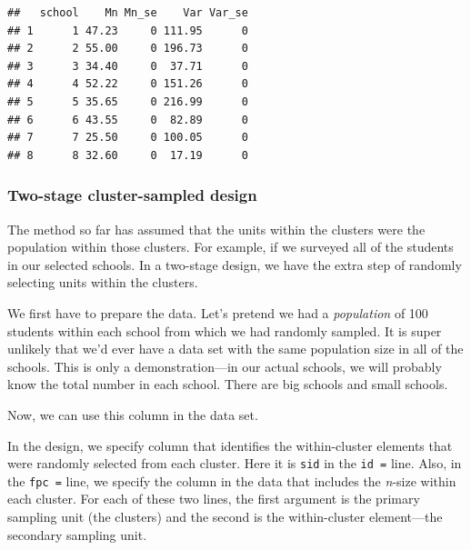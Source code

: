 \documentclass[
]{article}
\newenvironment{Shaded}{\begin{snugshade}}{\end{snugshade}}
\newcommand{\DataTypeTok}[1]{\textcolor[rgb]{0.13,0.29,0.53}{#1}}
\newcommand{\DecValTok}[1]{\textcolor[rgb]{0.00,0.00,0.81}{#1}}
\newcommand{\KeywordTok}[1]{\textcolor[rgb]{0.13,0.29,0.53}{\textbf{#1}}}
\newcommand{\NormalTok}[1]{#1}
\newcommand{\OperatorTok}[1]{\textcolor[rgb]{0.81,0.36,0.00}{\textbf{#1}}}
\newcommand{\StringTok}[1]{\textcolor[rgb]{0.31,0.60,0.02}{#1}}
\begin{document}
\begin{verbatim}
##   school    Mn Mn_se    Var Var_se
## 1      1 47.23     0 111.95      0
## 2      2 55.00     0 196.73      0
## 3      3 34.40     0  37.71      0
## 4      4 52.22     0 151.26      0
## 5      5 35.65     0 216.99      0
## 6      6 43.55     0  82.89      0
## 7      7 25.50     0 100.05      0
## 8      8 32.60     0  17.19      0
\end{verbatim}

\hypertarget{two-stage-cluster-sampled-design}{%
\subsubsection{Two-stage cluster-sampled design}\label{two-stage-cluster-sampled-design}}

The method so far has assumed that the units within the clusters were the population within those clusters. For example, if we surveyed all of the students in our selected schools. In a two-stage design, we have the extra step of randomly selecting units within the clusters.

We first have to prepare the data. Let's pretend we had a \emph{population} of 100 students within each school from which we had randomly sampled. It is super unlikely that we'd ever have a data set with the same population size in all of the schools. This is only a demonstration---in our actual schools, we will probably know the total number in each school. There are big schools and small schools.

\begin{Shaded}
\end{Shaded}

Now, we can use this column in the data set.

In the design, we specify column that identifies the within-cluster elements that were randomly selected from each cluster. Here it is \texttt{sid} in the \texttt{id\ =} line. Also, in the \texttt{fpc\ =} line, we specify the column in the data that includes the \emph{n}-size within each cluster. For each of these two lines, the first argument is the primary sampling unit (the clusters) and the second is the within-cluster element---the secondary sampling unit.

\begin{Shaded}
\end{Shaded}
\end{document}
